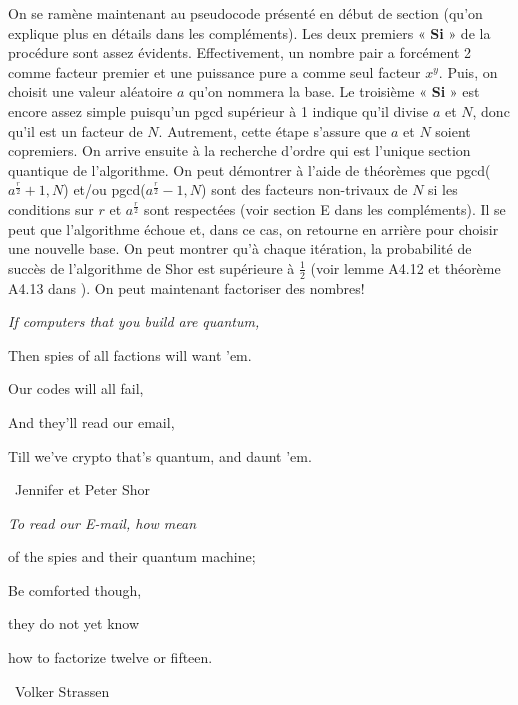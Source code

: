On se ramène maintenant au pseudocode présenté en début de section (qu'on explique plus en détails dans les compléments). Les deux premiers « \textbf{Si} » de la procédure sont assez évidents. Effectivement, un nombre pair a forcément 2 comme facteur premier et une puissance pure a comme seul facteur $x^y$. Puis, on choisit une valeur aléatoire $a$ qu'on nommera la base. Le troisième « \textbf{Si} » est encore assez simple puisqu'un pgcd supérieur à 1 indique qu'il divise $a$ et $N$, donc qu'il est un facteur de $N$. Autrement, cette étape s'assure que $a$ et $N$ soient copremiers. On arrive ensuite à la recherche d'ordre qui est l'unique section quantique de l'algorithme. On peut démontrer à l'aide de théorèmes que pgcd($a^{\frac{r}{2}} + 1, N$) et/ou pgcd($a^{\frac{r}{2}} - 1, N$) sont des facteurs non-trivaux de $N$ si les conditions sur $r$ et $a^{\frac{r}{2}}$ sont respectées (voir section E dans les compléments). Il se peut que l'algorithme échoue et, dans ce cas, on retourne en arrière pour choisir une nouvelle base. On peut montrer qu'à chaque itération, la probabilité de succès de l'algorithme de Shor est supérieure à $\frac{1}{2}$ (voir lemme A4.12 et théorème A4.13 dans \cite{nielsen00}). On peut maintenant factoriser des nombres!

\vspace{3em}
\begin{center}
        \itshape
        If computers that you build are quantum,
    
        Then spies of all factions will want 'em.
    
        Our codes will all fail,
    
        And they'll read our email,
        
        Till we've crypto that's quantum, and daunt 'em.

    \vspace{0.5em}
    \normalfont
    \textemdash\ Jennifer et Peter Shor
\end{center}

\vspace{2em}
\begin{center}
        \itshape
        To read our E-mail, how mean

        of the spies and their quantum machine;

        Be comforted though,

        they do not yet know

        how to factorize twelve or fifteen.

    \vspace{0.5em}
    \normalfont
    \textemdash\ Volker Strassen
\end{center}
